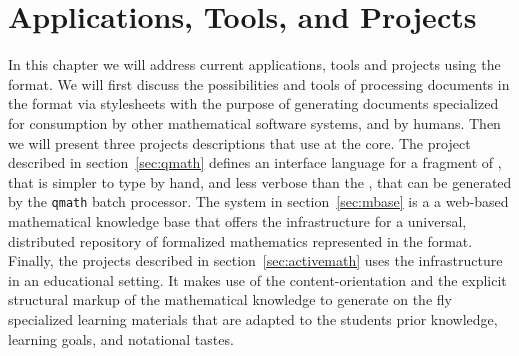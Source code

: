 \chapter{{\else{\omdoc}\fi} Applications, Tools,  and Projects}\label{chap:processing}\label{chap:projects}

In this chapter we will address current applications, tools and projects using the
{\omdoc} format.  We will first discuss the possibilities and tools of processing
documents in the {\omdoc} format via stylesheets with the purpose of generating
documents specialized for consumption by other mathematical software systems, and
by humans. Then we will present three projects descriptions that use {\omdoc} at
the core. The {\qmath} project described in section~\ref{sec:qmath} defines an
interface language for a fragment of {\omdoc}, that is simpler to type by hand,
and less verbose than the {\omdoc}, that can be generated by the {\tt{qmath}}
batch processor. The {\mbase} system in section~\ref{sec:mbase} is a a web-based
mathematical knowledge base that offers the infrastructure for a universal,
distributed repository of formalized mathematics represented in the {\omdoc}
format. Finally, the {\activemath} projects described in
section~\ref{sec:activemath} uses the {\omdoc} infrastructure in an educational
setting. It makes use of the content-orientation and the explicit structural
markup of the mathematical knowledge to generate on the fly specialized learning
materials that are adapted to the students prior knowledge, learning goals, and
notational tastes.

